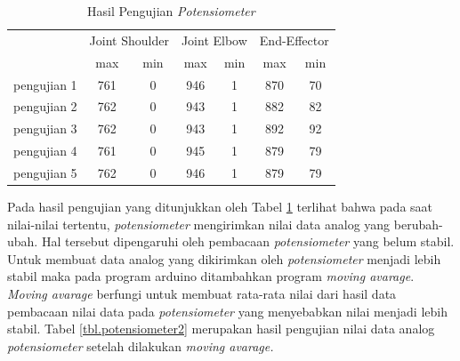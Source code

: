 \begin{table}[H]
	\centering
	\caption{Hasil Pengujian \textit{Potensiometer}}
	\label{tbl.potensiometer}
	\begin{tabular}{|c|c|c|c|c|c|c|}
		\hline
		\rowcolor[HTML]{9B9B9B} 
		\cellcolor[HTML]{9B9B9B}                            & \multicolumn{2}{c|}{\cellcolor[HTML]{9B9B9B}Joint Shoulder} & \multicolumn{2}{c|}{\cellcolor[HTML]{9B9B9B}Joint Elbow} & \multicolumn{2}{c|}{\cellcolor[HTML]{9B9B9B}End-Effector} \\ \cline{2-7} 
		\rowcolor[HTML]{9B9B9B} 
		\multirow{-2}{*}{\cellcolor[HTML]{9B9B9B}Pengujian} & max                          & min                          & max                         & min                        & max                         & min                         \\ \hline
		pengujian 1                                         & 761                          & 0                            & 946                         & 1                          & 870                         & 70                          \\ \hline
		pengujian 2                                         & 762                          & 0                            & 943                         & 1                          & 882                         & 82                          \\ \hline
		pengujian 3                                         & 762                          & 0                            & 943                         & 1                          & 892                         & 92                          \\ \hline
		pengujian 4                                         & 761                          & 0                            & 945                         & 1                          & 879                         & 79                          \\ \hline
		pengujian 5                                         & 762                          & 0                            & 946                         & 1                          & 879                         & 79                          \\ \hline
	\end{tabular}
\end{table} 

Pada hasil pengujian yang ditunjukkan oleh Tabel \ref{tbl.potensiometer} terlihat bahwa pada saat nilai-nilai tertentu, \textit{potensiometer}  mengirimkan nilai data analog yang berubah-ubah. Hal tersebut dipengaruhi oleh pembacaan \textit{potensiometer} yang belum stabil. Untuk membuat data analog yang dikirimkan oleh \textit{potensiometer} menjadi lebih stabil maka pada program arduino ditambahkan program \textit{moving avarage}. \textit{Moving avarage} berfungi untuk membuat rata-rata nilai dari hasil data pembacaan nilai data pada \textit{potensiometer} yang menyebabkan nilai menjadi lebih stabil. Tabel \ref{tbl.potensiometer2} merupakan hasil pengujian nilai data analog \textit{potensiometer} setelah dilakukan \textit{moving avarage.}

